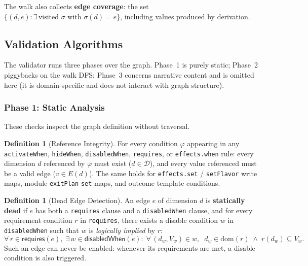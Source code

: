 \documentclass[11pt]{article}
\theoremstyle{definition}
\newtheorem{definition}[theorem]{Definition}
\newcommand{\Dim}{\mathcal{D}}         %
\newcommand{\Edg}[1]{E(#1)}            %
\newcommand{\sel}{\sigma}              %
\begin{document}
The walk also collects \textbf{edge coverage}: the set
$\{(d,e) : \exists\,\text{visited } \sel \text{ with } \sel(d)=e\}$,
including values produced by derivation.

\subsection{Validation Algorithms}\label{sec:validate}

The validator runs three phases over the graph. Phase~1 is purely static;
Phase~2 piggybacks on the \textsf{walk} DFS; Phase~3 concerns narrative
content and is omitted here (it is domain-specific and does not interact
with graph structure).

\subsubsection{Phase 1: Static Analysis}\label{sec:static}

These checks inspect the graph definition without traversal.

\begin{definition}[Reference Integrity]\label{def:refint}
For every condition $\varphi$ appearing in any \texttt{activateWhen},
\texttt{hideWhen}, \texttt{disabledWhen}, \texttt{requires}, or
\texttt{effects.when} rule: every dimension $d$ referenced
by $\varphi$ must exist ($d \in \Dim$), and every value referenced
must be a valid edge ($v \in \Edg{d}$). The same holds for
\texttt{effects.set} / \texttt{setFlavor} write maps,
module \texttt{exitPlan} \texttt{set} maps, and outcome template
conditions.
\end{definition}

\begin{definition}[Dead Edge Detection]\label{def:deaded}
An edge $e$ of dimension $d$ is \textbf{statically dead} if $e$ has
both a \texttt{requires} clause and a \texttt{disabledWhen} clause, and
for every requirement condition $r$ in \texttt{requires}, there exists a
disable condition $w$ in \texttt{disabledWhen} such that $w$ is
\emph{logically implied} by $r$:
\[
  \forall\, r \in \mathsf{requires}(e),\;
  \exists\, w \in \mathsf{disabledWhen}(e) :\;
  \forall\, (d_w, V_w) \in w,\;\;
    d_w \in \mathrm{dom}(r) \;\wedge\;
    r(d_w) \subseteq V_w.
\]
Such an edge can never be enabled: whenever its requirements are met, a
disable condition is also triggered.
\end{definition}
\end{document}
